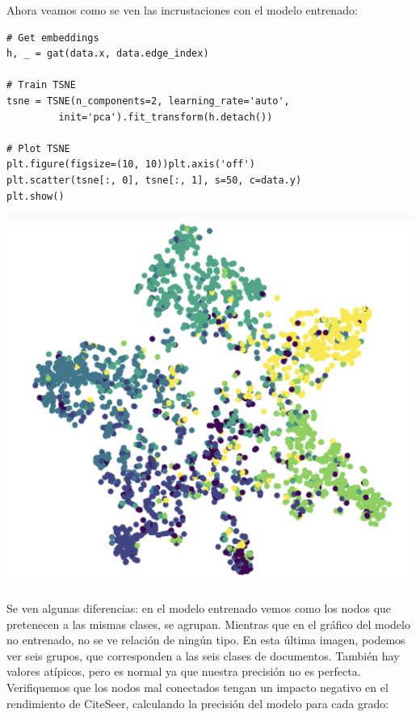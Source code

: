 \documentclass{article}
\begin{document}
\vspace{0.5cm}

Ahora veamos como se ven las incrustaciones con el modelo entrenado:

\vspace{0.5cm}

\begin{lstlisting}[style=mystyle]
# Get embeddings
h, _ = gat(data.x, data.edge_index)

# Train TSNE
tsne = TSNE(n_components=2, learning_rate='auto',
         init='pca').fit_transform(h.detach())

# Plot TSNE
plt.figure(figsize=(10, 10))plt.axis('off')
plt.scatter(tsne[:, 0], tsne[:, 1], s=50, c=data.y)
plt.show()
\end{lstlisting}

\vspace{0.5cm}

\begin{center}
    \includegraphics[width=0.75\linewidth]{img/entrenado.png}
\end{center}

\vspace{0.5cm}

Se ven algunas diferencias: en el modelo entrenado vemos como los nodos que pretenecen a las mismas clases, se agrupan. Mientras que en el gráfico del modelo no entrenado, no se ve relación de ningún tipo.
En esta última imagen, podemos ver seis grupos, que corresponden a las seis clases de documentos. También hay valores atípicos, pero es normal ya que nuestra precisión no es perfecta.
Verifiquemos que los nodos mal conectados tengan un impacto negativo en el rendimiento de CiteSeer, calculando la precisión del modelo para cada grado:
\end{document}
